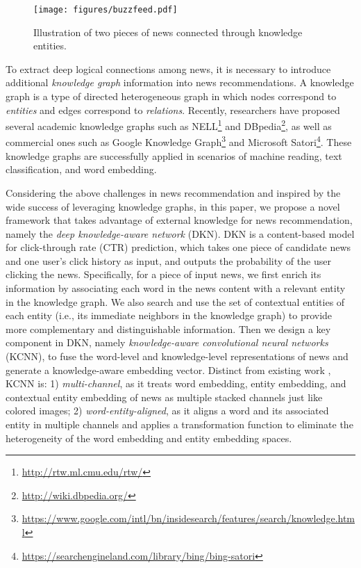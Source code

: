 \documentclass[sigconf]{acmart}
\begin{document}
	\begin{figure}[t]
		\centering
  		\texttt{[image: figures/buzzfeed.pdf]}
  		\caption{Illustration of two pieces of news connected through knowledge entities.}
  		\label{fig:buzzfeed}
  		\vspace{-0.1in}
	\end{figure}
	
	To extract deep logical connections among news, it is necessary to introduce additional \textit{knowledge graph} information into news recommendations.
	A knowledge graph is a type of directed heterogeneous graph in which nodes correspond to \textit{entities} and edges correspond to \textit{relations}.
	Recently, researchers have proposed several academic knowledge graphs such as NELL\footnote{\url{http://rtw.ml.cmu.edu/rtw/}} and DBpedia\footnote{\url{http://wiki.dbpedia.org/}}, as well as commercial ones such as Google Knowledge Graph\footnote{\url{https://www.google.com/intl/bn/insidesearch/features/search/knowledge.html}} and Microsoft Satori\footnote{\url{https://searchengineland.com/library/bing/bing-satori}}.
	These knowledge graphs are successfully applied in scenarios of machine reading\cite{yang2017leveraging}, text classification\cite{wang2017combining}, and word embedding\cite{xu2014rc}.
	
	Considering the above challenges in news recommendation and inspired by the wide success of leveraging knowledge graphs, in this paper, we propose a novel framework that takes advantage of external knowledge for news recommendation, namely the \textit{deep knowledge-aware network} (DKN).
	DKN is a content-based model for click-through rate (CTR) prediction, which takes one piece of candidate news and one user's click history as input, and outputs the probability of the user clicking the news.
	Specifically, for a piece of input news, we first enrich its information by associating each word in the news content with a relevant entity in the knowledge graph.
	We also search and use the set of contextual entities of each entity (i.e., its immediate neighbors in the knowledge graph) to provide more complementary and distinguishable information.
	Then we design a key component in DKN, namely \textit{knowledge-aware convolutional neural networks} (KCNN), to fuse the word-level and knowledge-level representations of news and generate a knowledge-aware embedding vector.
	Distinct from existing work \cite{wang2017combining}, KCNN is:
	1) \textit{multi-channel}, as it treats word embedding, entity embedding, and contextual entity embedding of news as multiple stacked channels just like colored images;
	2) \textit{word-entity-aligned}, as it aligns a word and its associated entity in multiple channels and applies a transformation function to eliminate the heterogeneity of the word embedding and entity embedding spaces.
\end{document}

